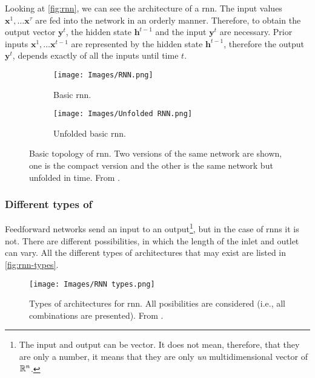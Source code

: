 Looking at \vref{fig:rnn}, we can see the architecture of a \gls{rnn}. The
input values \(\mathbf{x}^1, \ldots \mathbf{x}^\tau\) are fed into the network
in an orderly manner. Therefore, to obtain the output vector \(\mathbf{y}^t\),
the hidden state \(\mathbf{h}^{t - 1}\) and the input \(\mathbf{y}^{t}\) are
necessary. Prior inputs \(\mathbf{x}^1, \ldots \mathbf{x}^{t - 1}\) are
represented by the hidden state \(\mathbf{h}^{t - 1}\), therefore the output
\(\mathbf{y}^t\), depends exactly of all the inputs until time \(t\).

\begin{figure}[ht]
  \begin{subfigure}[t]{.2\textwidth}
    \centering
    \caption{Basic \gls{rnn}.}
    \texttt{[image: Images/RNN.png]}
  \end{subfigure}\hfill
  \begin{subfigure}[t]{.8\textwidth}
    \centering
    \caption{Unfolded basic \gls{rnn}.}
    \texttt{[image: Images/Unfolded RNN.png]}
  \end{subfigure}
  \caption[Basic topology of ]{Basic topology of
    \acf{rnn}. Two versions of the same network are shown, one is the compact
    version and the other is the same network but unfolded in time. From
    .}\label{fig:rnn}
\end{figure}

\subsubsection{Different types of }

Feedforward networks send an input to an output\footnote{The input and output
  can be vector. It does not mean, therefore, that they are only a number, it
  means that they are only \emph{un} multidimensional vector of \(\mathbb{R}^n\).}, but
in the case of \glspl{rnn} it is not. There are different possibilities, in
which the length of the inlet and outlet can vary. All the different types of
architectures that may exist are listed in \vref{fig:rnn-types}.

\begin{figure}[ht]
  \centering
  \texttt{[image: Images/RNN types.png]}
  \caption[Types of architectures for ]{Types of
    architectures for \gls{rnn}. All posibilities are considered (i.e., all
    combinations are presented). From .}\label{fig:rnn-types}
\end{figure}

